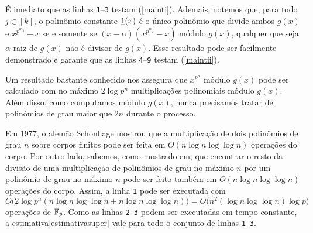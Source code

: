 É imediato que as linhas \texttt{1}--\texttt{3}
 testam (\ref{mainti}). Ademais,
notemos que, para todo $j\in[k]$, o polinômio constante
      $\underline{1}(x)$
    é o único polinômio que divide ambos $g(x)$ e $x^{p^{m_j}}-x$ se e
    somente se
$(x-\alpha)(x^{p^{m_j}}-x)$ módulo $g(x)$, qualquer que seja $\alpha$
    raiz de $g(x)$ não é divisor de $g(x)$. Esse
    resultado pode ser facilmente demonstrado e garante que as linhas
    \texttt{4}--\texttt{9} testam (\ref{maintii}).

Um resultado bastante conhecido nos assegura que $x^{p^n}$ módulo $g(x)$
pode ser calculado com no máximo $2\log{p^n}$ multiplicações polinomiais
módulo
$g(x)$. Além disso, como computamos módulo $g(x)$, nunca precisamos
tratar de polinômios de grau maior que $2n$ durante o processo.

Em 1977, o alemão Schonhage\cite{schnelle} mostrou que a multiplicação
de dois polinômios de grau $n$ sobre corpos finitos pode ser feita em
$O(n\log{n}\log{\log{n}})$ operações do corpo. Por outro lado,
sabemos, como
mostrado em\xspace\cite{design}, que encontrar o resto da divisão de uma
multiplicação de polinômios de grau no máximo $n$ por um polinômio de
grau no máximo $n$ pode ser feito também em $O(n\log{n}\log{\log{n}})$
operações do corpo.
Assim, a linha \texttt{1} pode ser executada com
\begin{equation}\label{estimativasuper}
  O\bigl(2\log{p^n}(n\log{n}\log{\log{n}}+n\log{n}\log{\log{n}})\bigr) =
  O\bigl(n^2(\log{n}\log{\log{n}})\log{p}\bigr)
\end{equation}
operações de $\mathbb{F}_{p}$. Como as linhas \texttt{2}--\texttt{3}
podem ser executadas
em tempo constante, a estimativa\xspace\ref{estimativasuper} vale para
todo o conjunto de linhas \texttt{1}--\texttt{3}.

